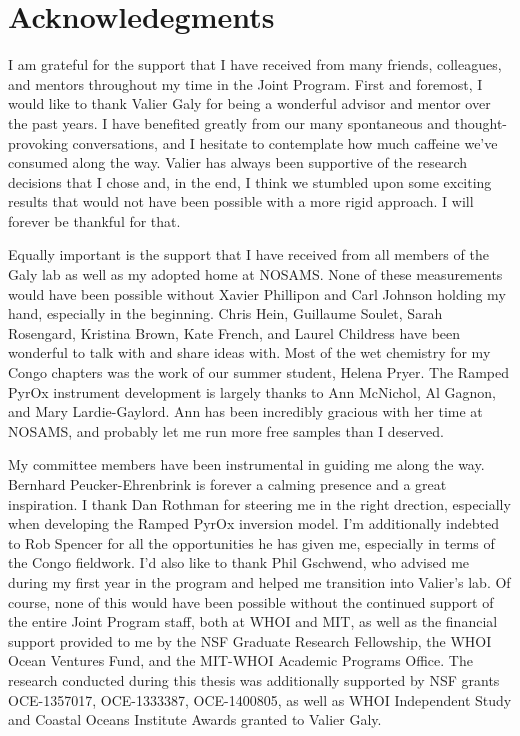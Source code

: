 \cleardoublepage

\section*{Acknowledegments}

I am grateful for the support that I have received from many friends, colleagues, and mentors throughout my time in the Joint Program. First and foremost, I would like to thank Valier Galy for being a wonderful advisor and mentor over the past years. I have benefited greatly from our many spontaneous and thought-provoking conversations, and I hesitate to contemplate how much caffeine we've consumed along the way. Valier has always been supportive of the research decisions that I chose and, in the end, I think we stumbled upon some exciting results that would not have been possible with a more rigid approach. I will forever be thankful for that.

Equally important is the support that I have received from all members of the Galy lab as well as my adopted home at NOSAMS. None of these measurements would have been possible without Xavier Phillipon and Carl Johnson holding my hand, especially in the beginning. Chris Hein, Guillaume Soulet, Sarah Rosengard, Kristina Brown, Kate French, and Laurel Childress have been wonderful to talk with and share ideas with. Most of the wet chemistry for my Congo chapters was the work of our summer student, Helena Pryer. The Ramped PyrOx instrument development is largely thanks to Ann McNichol, Al Gagnon, and Mary Lardie-Gaylord. Ann has been incredibly gracious with her time at NOSAMS, and probably let me run more free samples than I deserved.

My committee members have been instrumental in guiding me along the way. Bernhard Peucker-Ehrenbrink is forever a calming presence and a great inspiration. I thank Dan Rothman for steering me in the right drection, especially when developing the Ramped PyrOx inversion model. I'm additionally indebted to Rob Spencer for all the opportunities he has given me, especially in terms of the Congo fieldwork. I'd also like to thank Phil Gschwend, who advised me during my first year in the program and helped me transition into Valier's lab. Of course, none of this would have been possible without the continued support of the entire Joint Program staff, both at WHOI and MIT, as well as the financial support provided to me by the NSF Graduate Research Fellowship, the WHOI Ocean Ventures Fund, and the MIT-WHOI Academic Programs Office. The research conducted during this thesis was additionally supported by NSF grants OCE-1357017, OCE-1333387, OCE-1400805, as well as WHOI Independent Study and Coastal Oceans Institute Awards granted to Valier Galy.

